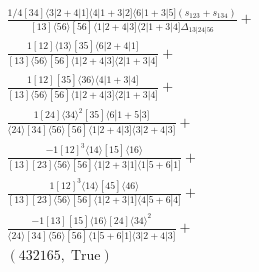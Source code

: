 \documentclass[varwidth, border=5pt]{standalone}
\begin{document}
\begin{my}
$\begin{gathered}
\scriptscriptstyle\frac{1/4[34]⟨3|2+4|1]⟨4|1+3|2]⟨6|1+3|5](s_{123}+s_{134})}{[13]⟨56⟩[56]⟨1|2+4|3]⟨2|1+3|4]Δ_{13|24|56}}+\\
\scriptscriptstyle\frac{1[12]⟨13⟩[35]⟨6|2+4|1]}{[13]⟨56⟩[56]⟨1|2+4|3]⟨2|1+3|4]}+\\
\scriptscriptstyle\frac{1[12][35]⟨36⟩⟨4|1+3|4]}{[13]⟨56⟩[56]⟨1|2+4|3]⟨2|1+3|4]}+\\
\scriptscriptstyle\frac{1[24]⟨34⟩^2[35]⟨6|1+5|3]}{⟨24⟩[34]⟨56⟩[56]⟨1|2+4|3]⟨3|2+4|3]}+\\
\scriptscriptstyle\frac{-1[12]^3⟨14⟩[15]⟨16⟩}{[13][23]⟨56⟩[56]⟨1|2+3|1]⟨1|5+6|1]}+\\
\scriptscriptstyle\frac{1[12]^3⟨14⟩[45]⟨46⟩}{[13][23]⟨56⟩[56]⟨1|2+3|1]⟨4|5+6|4]}+\\
\scriptscriptstyle\frac{-1[13][15]⟨16⟩[24]⟨34⟩^2}{⟨24⟩[34]⟨56⟩[56]⟨1|5+6|1]⟨3|2+4|3]}+\\
\scriptscriptstyle(432165,\;\text{True})\phantom{+}
\end{gathered}$
\end{my}
\end{document}
